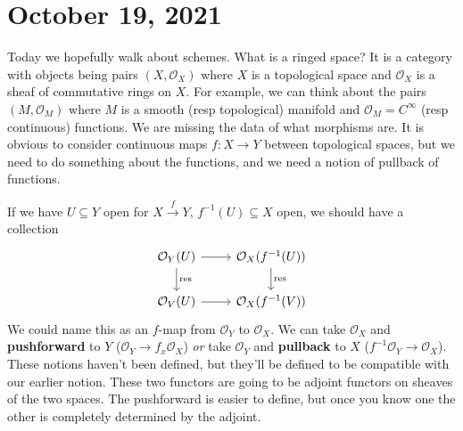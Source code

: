 \section{October 19, 2021}
Today we hopefully walk about schemes. What is a ringed space? It is a category with objects being pairs $(X, \mathcal{O} _X)$ where $X$ is a topological space and $\mathcal{O} _X$ is a sheaf of commutative rings on $X$. For example, we can think about the pairs  $(M, \mathcal{O} _M)$ where $M$ is a smooth (resp topological) manifold and $\mathcal{O} _M= C^{\infty}$ (resp continuous) functions. We are missing the data of what morphisms are. It is obvious to consider continuous maps $f \colon X \to Y$ between topological spaces, but we need to do something about the functions, and we need a notion of pullback of functions.

If we have $U \subseteq Y$ open for $X \xrightarrow{f} Y$, $f^{-1}(U) \subseteq X$ open, we should have a collection  \[
\begin{tikzcd}
\mathcal O_Y(U) \arrow[d, "\mathrm{res}"] \arrow[r] & \mathcal O_X(f^{-1}(U)) \arrow[d, "\mathrm{res}"] \\
\mathcal O_V(U) \arrow[r]                           & \mathcal O_X(f^{-1}(V))                          
\end{tikzcd}
\] We could name this as an $f$-map from $\mathcal{O} _Y$ to $\mathcal{O} _X$. We can take $\mathcal{O} _X$ and \textbf{pushforward} to $Y$ ($\mathcal{O} _Y \to f_x\mathcal{O} _X$) \emph{or} take $\mathcal{O} _Y$ and \textbf{pullback} to $X$ ($f ^{-1}\mathcal{O} _Y \to \mathcal{O} _X$). These notions haven't been defined, but they'll be defined to be compatible with our earlier notion. These two functors are going to be adjoint functors on sheaves of the two spaces. The pushforward is easier to define, but once you know one the other is completely determined by the adjoint.

